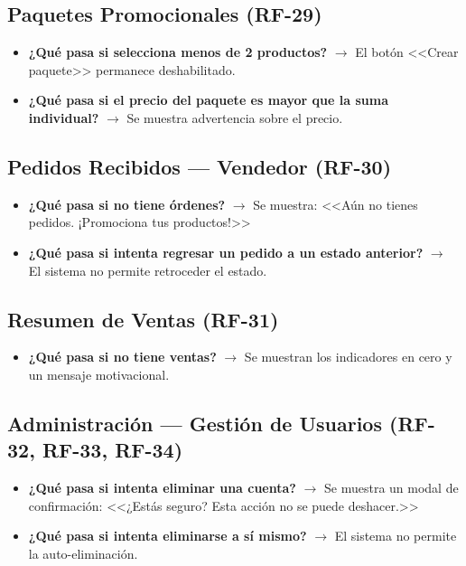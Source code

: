 \documentclass[12pt,a4paper]{article}
\begin{document}
\subsection{Paquetes Promocionales (RF-29)}
\begin{itemize}
    \item \textbf{¿Qué pasa si selecciona menos de 2 productos?} $\rightarrow$ El botón <<Crear paquete>> permanece deshabilitado.
    \item \textbf{¿Qué pasa si el precio del paquete es mayor que la suma individual?} $\rightarrow$ Se muestra advertencia sobre el precio.
\end{itemize}

\subsection{Pedidos Recibidos --- Vendedor (RF-30)}
\begin{itemize}
    \item \textbf{¿Qué pasa si no tiene órdenes?} $\rightarrow$ Se muestra: <<Aún no tienes pedidos. ¡Promociona tus productos!>>
    \item \textbf{¿Qué pasa si intenta regresar un pedido a un estado anterior?} $\rightarrow$ El sistema no permite retroceder el estado.
\end{itemize}

\subsection{Resumen de Ventas (RF-31)}
\begin{itemize}
    \item \textbf{¿Qué pasa si no tiene ventas?} $\rightarrow$ Se muestran los indicadores en cero y un mensaje motivacional.
\end{itemize}

\subsection{Administración --- Gestión de Usuarios (RF-32, RF-33, RF-34)}
\begin{itemize}
    \item \textbf{¿Qué pasa si intenta eliminar una cuenta?} $\rightarrow$ Se muestra un modal de confirmación: <<¿Estás seguro? Esta acción no se puede deshacer.>>
    \item \textbf{¿Qué pasa si intenta eliminarse a sí mismo?} $\rightarrow$ El sistema no permite la auto-eliminación.
\end{itemize}
\end{document}
